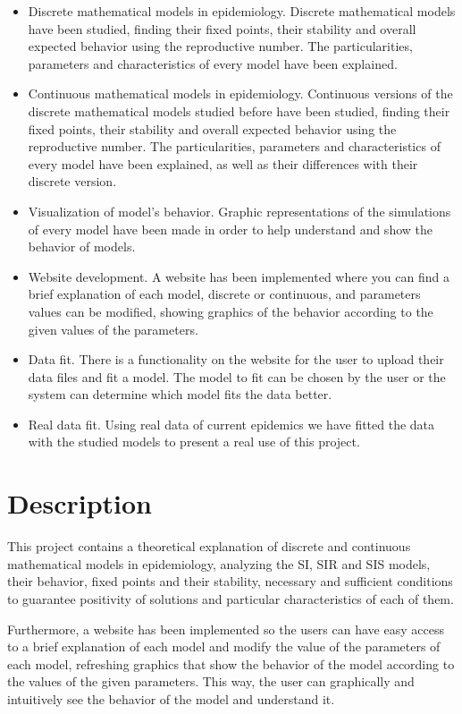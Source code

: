 \begin{itemize}
\item Discrete mathematical models in epidemiology. Discrete mathematical models have been studied, finding their fixed points, their stability and overall expected behavior using the reproductive number. The particularities, parameters and characteristics of every model have been explained.
\item Continuous mathematical models in epidemiology. Continuous versions of the discrete mathematical models studied before have been studied, finding their fixed points, their stability and overall expected behavior using the reproductive number. The particularities, parameters and characteristics of every model have been explained, as well as their differences with their discrete version.
\item Visualization of model's behavior. Graphic representations of the simulations of every model have been made in order to help understand and show the behavior of models.
\item Website development. A website has been implemented where you can find a brief explanation of each model, discrete or continuous, and parameters values can be modified, showing graphics of the behavior according to the given values of the parameters.
\item Data fit. There is a functionality on the website for the user to upload their data files and fit a model. The model to fit can be chosen by the user or the system can determine which model fits the data better.
\item Real data fit. Using real data of current epidemics we have fitted the data with the studied models to present a real use of this project.
\end{itemize}

\section*{Description}

This project contains a theoretical explanation of discrete and continuous mathematical models in epidemiology, analyzing the SI, SIR and SIS models, their behavior, fixed points and their stability, necessary and sufficient conditions to guarantee positivity of solutions and particular characteristics of each of them. 

Furthermore, a website has been implemented so the users can have easy access to a brief explanation of each model and modify the value of the parameters of each model, refreshing graphics that show the behavior of the model according to the values of the given parameters. This way, the user can graphically and intuitively see the behavior of the model and understand it.

